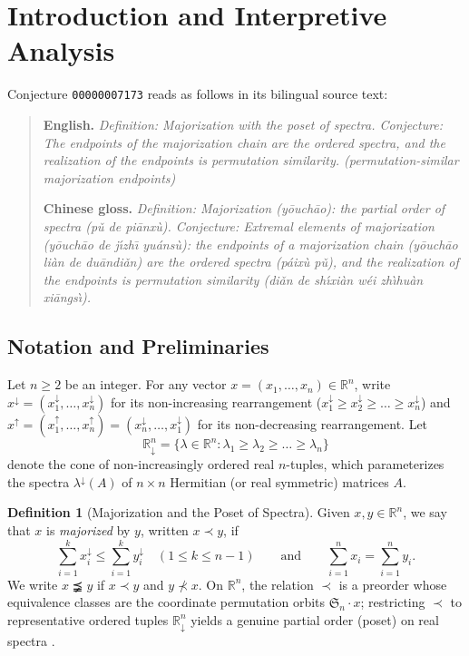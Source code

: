 \documentclass[11pt]{article}
\theoremstyle{definition}
\newtheorem{definition}[theorem]{Definition}
\theoremstyle{remark}
\newcommand{\R}{\mathbb{R}}
\begin{document}
\section{Introduction and Interpretive Analysis}

Conjecture \texttt{00000007173} reads as follows in its bilingual source text:
\begin{quote}
\textbf{English.} \emph{Definition: Majorization with the poset of spectra.
Conjecture: The endpoints of the majorization chain are the ordered spectra, and
the realization of the endpoints is permutation similarity. (permutation-similar
majorization endpoints)}

\medskip
\noindent\textbf{Chinese gloss.} \emph{Definition: Majorization (\textnormal{y\=ouch\=ao}):
the partial order of spectra (\textnormal{p\v{u} de pi\=anx\`u}). Conjecture:
Extremal elements of majorization (\textnormal{y\=ouch\=ao de j\'{\i}zh\={\i}
yu\'ans\`u}): the endpoints of a majorization chain (\textnormal{y\=ouch\=ao
li\`an de du\=andi\v{a}n}) are the ordered spectra (\textnormal{p\'aix\`u p\v{u}}),
and the realization of the endpoints is permutation similarity (\textnormal{di\v{a}n
de sh\'{\i}xi\`an w\'ei zh\`{\i}hu\`an xi\=angs\`{\i}}).}
\end{quote}

\subsection{Notation and Preliminaries}

Let $n \ge 2$ be an integer. For any vector $x = (x_1,\dots,x_n) \in \R^n$, write
$x^\downarrow = (x_1^\downarrow,\dots,x_n^\downarrow)$ for its non-increasing
rearrangement ($x_1^\downarrow \ge x_2^\downarrow \ge \dots \ge x_n^\downarrow$)
and $x^\uparrow = (x_1^\uparrow,\dots,x_n^\uparrow) = (x_n^\downarrow,\dots,x_1^\downarrow)$
for its non-decreasing rearrangement. Let
\[
  \R_\downarrow^n = \bigl\{ \lambda \in \R^n : \lambda_1 \ge \lambda_2 \ge \dots \ge \lambda_n \bigr\}
\]
denote the cone of non-increasingly ordered real $n$-tuples, which parameterizes
the spectra $\lambda^\downarrow(A)$ of $n \times n$ Hermitian (or real symmetric)
matrices $A$.

\begin{definition}[Majorization and the Poset of Spectra]
\label{def:majorization}
Given $x, y \in \R^n$, we say that $x$ is \emph{majorized} by $y$, written
$x \prec y$, if
\begin{equation}
  \label{eq:maj}
  \sum_{i=1}^k x_i^\downarrow \le \sum_{i=1}^k y_i^\downarrow
  \quad (1 \le k \le n-1)
  \qquad\text{and}\qquad
  \sum_{i=1}^n x_i = \sum_{i=1}^n y_i.
\end{equation}
We write $x \precneqq y$ if $x \prec y$ and $y \not\prec x$. On $\R^n$, the
relation $\prec$ is a preorder whose equivalence classes are the coordinate
permutation orbits $\mathfrak{S}_n \cdot x$; restricting $\prec$ to representative
ordered tuples $\R_\downarrow^n$ yields a genuine partial order (poset) on real
spectra \cite{MOA2011,Bhatia1997}.
\end{definition}
\end{document}
